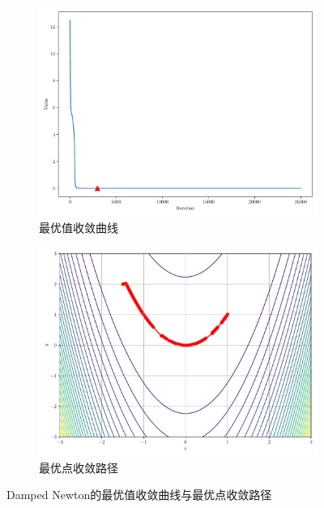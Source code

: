 \begin{figure}[!ht]
    \centering
    \begin{subfigure}{0.4\textwidth}
        \centering
        \includegraphics[width=\textwidth]{figures/Damped Newton_loss.pdf}
        \caption{最优值收敛曲线}
    \end{subfigure}
    \begin{subfigure}{0.4\textwidth}
        \centering
        \includegraphics[width=\textwidth]{figures/Damped Newton_points.pdf}
        \caption{最优点收敛路径}
    \end{subfigure}
    \caption{Damped Newton的最优值收敛曲线与最优点收敛路径}
\end{figure}
